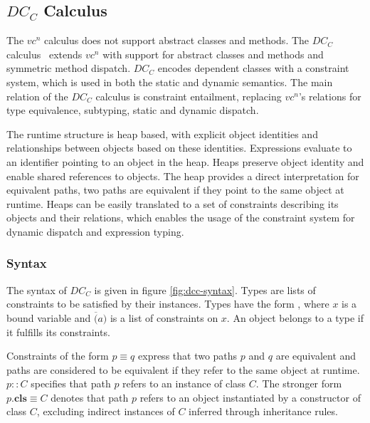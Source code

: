 \subsection{$DC_C$ Calculus}
\label{sec:dcc}
The $vc^n$ calculus does not support abstract classes and methods.
The $DC_C$ calculus~\cite{vaidas:thesis} extends $vc^n$ with support for abstract classes and methods
and symmetric method dispatch.
$DC_C$ encodes dependent classes with a constraint system,
which is used in both the static and dynamic semantics.
The main relation of the $DC_C$ calculus is constraint entailment,
replacing $vc^n$'s relations for type equivalence, subtyping, static and dynamic dispatch.

The runtime structure is heap based,
with explicit object identities
and relationships between objects based on these identities.
Expressions evaluate to an identifier pointing to an object in the heap.
Heaps preserve object identity and enable shared references to objects.
The heap provides a direct interpretation for equivalent paths,
two paths are equivalent if they point to the same object at runtime.
Heaps can be easily translated to a set of constraints describing its objects and their relations,
which enables the usage of the constraint system for dynamic dispatch and expression typing.
\subsubsection{Syntax}
The syntax of $DC_C$ is given in figure \ref{fig:dcc-syntax}.
Types are lists of constraints to be satisfied by their instances.
Types have the form , where $x$ is a bound variable
and $\overline(a)$ is a list of constraints on $x$.
An object belongs to a type if it fulfills its constraints.

Constraints of the form $p \equiv q$ express that two paths $p$ and $q$ are equivalent
and paths are considered to be equivalent if they refer to the same object at runtime.
$p :: C$ specifies that path $p$ refers to an instance of class $C$.
The stronger form $p.\textbf{cls} \equiv C$ denotes that
path $p$ refers to an object instantiated by a constructor of class $C$,
excluding indirect instances of $C$ inferred through inheritance rules.

